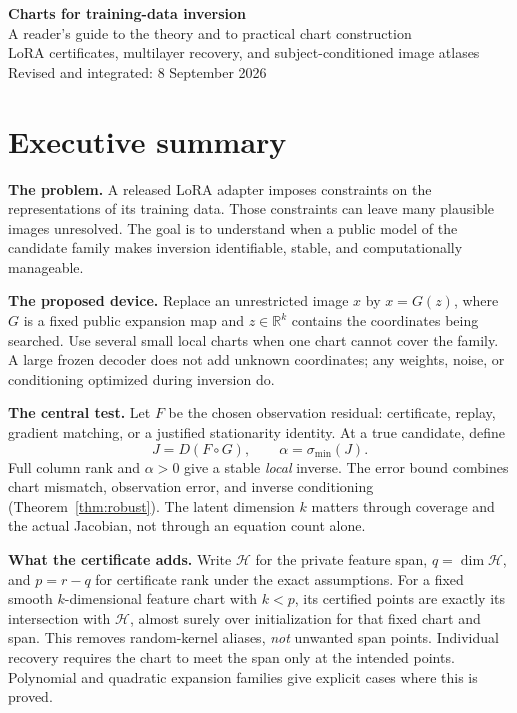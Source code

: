 \documentclass[11pt,a4paper]{article}
\theoremstyle{definition}
\theoremstyle{definition}
\theoremstyle{remark}\newtheorem{remark}[theorem]{Remark}
\newcommand{\R}{\mathbb R}\newcommand{\Prob}{\mathbb P}\newcommand{\E}{\mathbb E}
\newcommand{\HH}{\mathcal H}\newcommand{\XX}{\mathcal X}\newcommand{\col}{\operatorname{col}}
\begin{document}
\begin{center}
{\LARGE\bfseries Charts for training-data inversion}\\[5pt]
{\large A reader's guide to the theory and to practical chart construction}\\[5pt]
{LoRA certificates, multilayer recovery, and subject-conditioned image atlases}\\[4pt]
Revised and integrated: 8 September 2026
\end{center}

\section*{Executive summary}

\textbf{The problem.} A released LoRA adapter imposes constraints on the representations of its training data. Those constraints can leave many plausible images unresolved. The goal is to understand when a public model of the candidate family makes inversion identifiable, stable, and computationally manageable.

\textbf{The proposed device.} Replace an unrestricted image $x$ by $x=G(z)$, where $G$ is a fixed public expansion map and $z\in\R^k$ contains the coordinates being searched. Use several small local charts when one chart cannot cover the family. A large frozen decoder does not add unknown coordinates; any weights, noise, or conditioning optimized during inversion do.

\textbf{The central test.} Let $F$ be the chosen observation residual: certificate, replay, gradient matching, or a justified stationarity identity. At a true candidate, define
\[
J=D(F\circ G),\qquad \alpha=\sigma_{\min}(J).
\]
Full column rank and $\alpha>0$ give a stable \emph{local} inverse. The error bound combines chart mismatch, observation error, and inverse conditioning (Theorem~\ref{thm:robust}). The latent dimension $k$ matters through coverage and the actual Jacobian, not through an equation count alone.

\textbf{What the certificate adds.} Write $\HH$ for the private feature span, $q=\dim\HH$, and $p=r-q$ for certificate rank under the exact assumptions. For a fixed smooth $k$-dimensional feature chart with $k<p$, its certified points are exactly its intersection with $\HH$, almost surely over initialization for that fixed chart and span. This removes random-kernel aliases, \emph{not} unwanted span points. Individual recovery requires the chart to meet the span only at the intended points. Polynomial and quadratic expansion families give explicit cases where this is proved.
\end{document}
